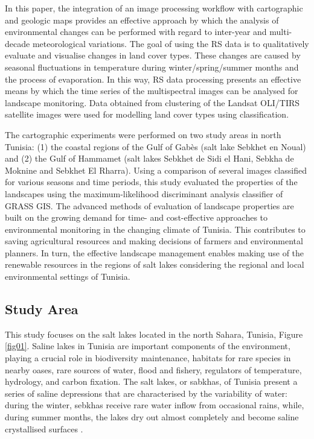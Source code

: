 \documentclass[land,article,accept,pdftex,moreauthors]{Definitions/mdpi}
\begin{document}
In this paper, the integration of an image processing workflow with cartographic and geologic maps provides {an} effective {approach} by which the analysis of environmental changes {can} be performed {with regard to inter-year and multi-decade meteorological variations}. The goal of using the RS data is to qualitatively evaluate and {visualise} changes in land cover types{. These changes are }caused by seasonal fluctuations in temperature during winter/spring/summer months and the process of evaporation. In this way, {RS data} processing {presents} an effective means by which the time series of the multispectral images {can} be analysed for landscape monitoring. Data obtained from {clustering} of the {Landsat OLI/TIRS }satellite images {were} used for modelling land cover types using classification. 

The cartographic experiments {were} performed on two {study} areas in north Tunisia: {(1)} the coastal regions of the Gulf of Gabès (salt lake Sebkhet en Noual) and {(2) }the Gulf of Hammamet (salt lakes Sebkhet de Sidi el Hani, Sebkha de Moknine and Sebkhet El Rharra). Using a comparison of several images classified for various seasons and time periods, this study {evaluated} the properties of the landscapes using the maximum-likelihood discriminant analysis classifier of GRASS GIS. The advanced methods of evaluation of landscape properties are built on the growing demand for time- and cost-effective approaches to environmental monitoring in the changing climate of Tunisia. {This contributes to }saving agricultural resources {and} making decisions of farmers and environmental planners. {In turn, the effective landscape management enables} making use of the renewable resources in the {regions of salt lakes considering} the regional and local {environmental} settings of {Tunisia.}

\subsection{Study Area}

This study focuses on the salt lakes located in the north Sahara, Tunisia, Figure \ref{fig01}. {Saline lakes in Tunisia are important components of the environment, playing a crucial role in biodiversity maintenance, habitats for rare species in nearby oases, rare sources of water, flood and fishery, regulators of temperature, hydrology, and carbon fixation. }The salt lakes, or sabkhas, of Tunisia present a series of saline depressions that are characterised by the variability of water: during the winter, sebkhas receive rare water inflow from occasional rains, while, during summer months, the lakes dry out almost completely and become saline crystallised surfaces \cite{berthon1970saumures,m2001valorisation,Gautier}. 
\end{document}
